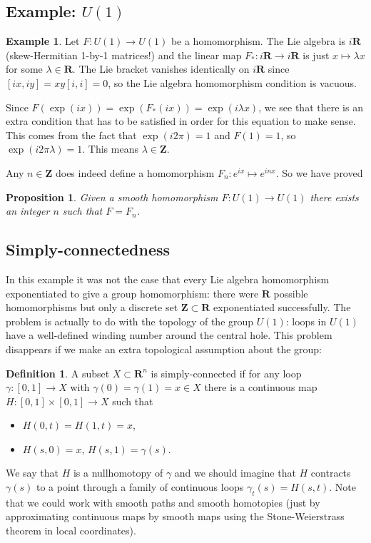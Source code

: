 \documentclass[12pt]{article}
\newcommand{\RR}{\mathbf{R}}
\newcommand{\ZZ}{\mathbf{Z}}
\newtheorem{prp}[thm]{Proposition}
\theoremstyle{definition}
\newtheorem{dfn}[thm]{Definition}
\newtheorem{exm}[thm]{Example}
\theoremstyle{check}
\theoremstyle{remark}
\theoremstyle{TheoremNum}
\begin{document}
\subsection{Example: $U(1)$}

\begin{exm}
Let $F\colon U(1)\to U(1)$ be a homomorphism. The Lie algebra is $i\RR$ (skew-Hermitian 1-by-1 matrices!) and the linear map $F_*\colon i\RR\to i\RR$ is just $x\mapsto\lambda x$ for some $\lambda\in\RR$. The Lie bracket vanishes identically on $i\RR$ since $[ix,iy]=xy[i,i]=0$, so the Lie algebra homomorphism condition is vacuous.

Since $F(\exp(ix))=\exp(F_*(ix))=\exp(i\lambda x)$, we see that there is an extra condition that has to be satisfied in order for this equation to make sense. This comes from the fact that $\exp(i2\pi)=1$ and $F(1)=1$, so $\exp(i2\pi\lambda)=1$. This means $\lambda\in\ZZ$.
\end{exm}

Any $n\in\ZZ$ does indeed define a homomorphism $F_n\colon e^{ix}\mapsto e^{inx}$. So we have proved

\begin{prp}
Given a smooth homomorphism $F\colon U(1)\to U(1)$ there exists an integer $n$ such that $F=F_n$.
\end{prp}

\subsection{Simply-connectedness}

In this example it was not the case that every Lie algebra homomorphism exponentiated to give a group homomorphism: there were $\RR$ possible homomorphisms but only a discrete set $\ZZ\subset\RR$ exponentiated successfully. The problem is actually to do with the topology of the group $U(1)$: loops in $U(1)$ have a well-defined winding number around the central hole. This problem disappears if we make an extra topological assumption about the group:

\begin{dfn}
A subset $X\subset\RR^n$ is simply-connected if for any loop $\gamma\colon[0,1]\to X$ with $\gamma(0)=\gamma(1)=x\in X$ there is a continuous map $H\colon [0,1]\times [0,1]\to X$ such that
\begin{itemize}
\item $H(0,t)=H(1,t)=x$,
\item $H(s,0)=x$, $H(s,1)=\gamma(s)$.
\end{itemize}
We say that $H$ is a nullhomotopy of $\gamma$ and we should imagine that $H$ contracts $\gamma(s)$ to a point through a family of continuous loops $\gamma_t(s)=H(s,t)$. Note that we could work with smooth paths and smooth homotopies (just by approximating continuous maps by smooth maps using the Stone-Weierstrass theorem in local coordinates).
\end{dfn}
\end{document}

